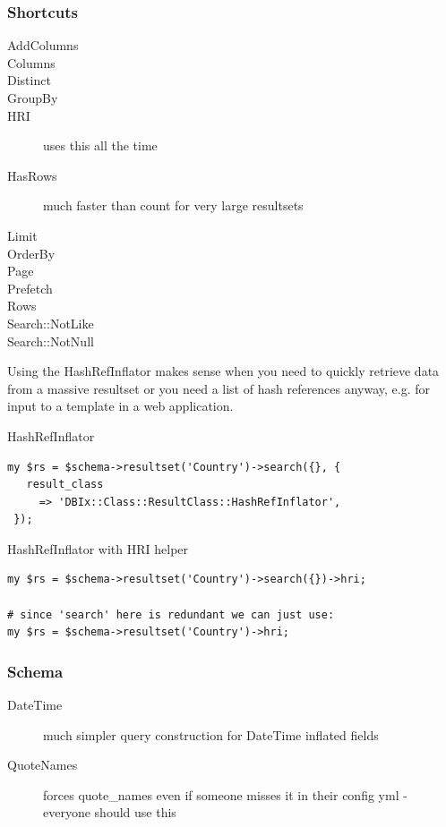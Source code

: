 \subsubsection{Shortcuts}
\begin{description}
\item[AddColumns] 
\item[Columns]
\item[Distinct]
\item[GroupBy] 
\item[HRI]
uses this all the time
\item[HasRows] much faster than count for very large resultsets
\item[Limit]
\item[OrderBy]
\item[Page]
\item[Prefetch]
\item[Rows]
\item[Search::{Not}Like]
\item[Search::{Not}Null] 
\end{description}

Using the HashRefInflator makes sense when you need to quickly retrieve
data from a massive resultset or you need a list of hash references anyway,
e.g. for input to a template in a web application.

\begin{frame}[fragile]{HashRefInflator}
\begin{lstlisting}
my $rs = $schema->resultset('Country')->search({}, {
   result_class
     => 'DBIx::Class::ResultClass::HashRefInflator',
 });
\end{lstlisting}
\end{frame}

\begin{frame}[fragile]{HashRefInflator with HRI helper}
\begin{lstlisting}
my $rs = $schema->resultset('Country')->search({})->hri;

# since 'search' here is redundant we can just use:
my $rs = $schema->resultset('Country')->hri;
\end{lstlisting}
\end{frame}

\subsubsection{Schema}
\begin{description}
\item[DateTime]
much simpler query construction for DateTime inflated fields
\item[QuoteNames] 
forces quote\_names even if someone misses it in their 
config yml - everyone should use this
\end{description}

